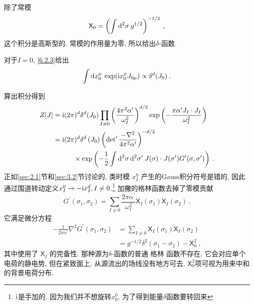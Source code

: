 除了常模
\begin{equation}
	\mathsf{X}_{0}=\left(\int \mathrm{d}^{2} \sigma \: g^{1 / 2}\right)^{-1 / 2} \:, \label{6.2.5}
\end{equation}
这个积分是高斯型的. 常模的作用量为零, 所以给出$\delta$-函数. 
\begin{tcolorbox}
	\begin{remark}
		对于$I=0$, \eqref{6.2.3}给出
		\[
			\int \mathrm{d} x^{\mu}_{0} \: \exp (\mathrm{i} x^{\mu}_{0}J_{0\mu}) \propto \delta^{d}(J_{0}) \:.
		\]
	\end{remark}
\end{tcolorbox}
\noindent 算出积分得到
	\begin{align}
		Z[J] &= \mathrm{i}(2 \pi)^{d} \delta^{d}(J_{0}) \prod_{I \neq 0} \left(\frac{4 \pi^{2} \alpha^{\prime}}{\omega_{I}^{2}}\right)^{d / 2} \exp \left(-\frac{\pi \alpha^{\prime} J_{I} \cdot J_{I}}{\omega_{I}^{2}}\right) \nonumber  \\
		&= \mathrm{i}(2 \pi)^{d} \delta^{d}\left(J_{0}\right)\left(\operatorname{det}^{\prime} \frac{-\nabla^{2}}{4 \pi^{2} \alpha^{\prime}}\right)^{-d / 2} \nonumber  \\
		& \qquad \quad \times \exp \left(-\frac{1}{2} \int \mathrm{d}^{2} \sigma \, \mathrm{d}^{2} \sigma^{\prime}\: J(\sigma) \cdot J(\sigma^{\prime}) 
		G^{\prime}(\sigma, \sigma^{\prime})\right) \:. \label{6.2.6}
	\end{align}
正如\ref{sec:2.1}节和\ref{sec:3.2}节讨论的, 类时模 $x_{I}^{0}$ 产生的Gauss积分符号是错的, 因此通过围道转动定义$x_{I}^{0} \to-\mathrm{i} x_{I}^{d}, I \neq 0 $.\footnote{$\mathrm{i}$是手加的, 因为我们并不想旋转$x_0^0$, 为了得到能量$\delta$函数要转回来} 加撇的格林函数去掉了零模贡献
\begin{equation}
	G^{\prime}(\sigma_{1}, \sigma_{2})=\sum_{I \neq 0} \frac{2 \pi \alpha^{\prime}}{\omega_{I}^{2}} \mathsf{X}_{I}(\sigma_{1}) \mathsf{X}_{I}(\sigma_{2}) \:. \label{6.2.7}
\end{equation}
它满足微分方程
	\begin{align}
		-\frac{1}{2 \pi \alpha^{\prime}} \nabla^{2} G^{\prime}(\sigma_{1}, \sigma_{2}) 
		&=\sum_{I \neq 0} \mathsf{X}_{I}(\sigma_{1}) \mathsf{X}_{I}(\sigma_{2})  \nonumber \\
		&=g^{-1 / 2} \delta^{2}(\sigma_{1}-\sigma_{2})-\mathsf{X}_{0}^{2}  \:, \label{6.2.8}
	\end{align}
其中使用了 $\mathsf{X}_{I}$ 的完备性. 那种源为$\delta$-函数的普通 格林 函数不存在. 它会对应单个电荷的静电势, 但在紧致面上, 从源流出的场线没有地方可去. 
$\mathsf{X}_{0}^{2}$项可视为用来中和的背景电荷分布.


